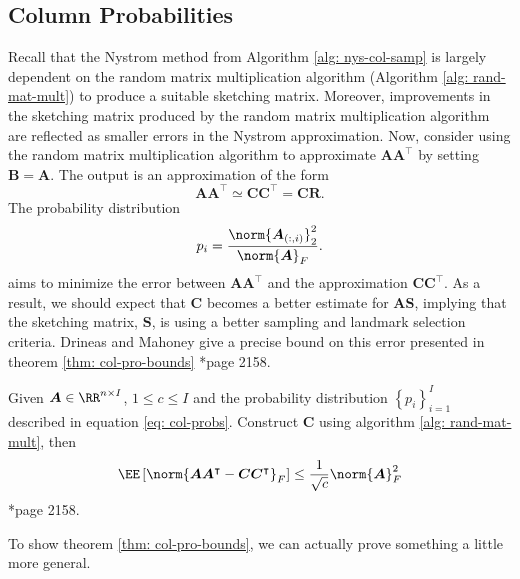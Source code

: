 \subsection{Column Probabilities}\label{Section2.2}

Recall that the Nystrom method from Algorithm \ref{alg: nys-col-samp} is largely dependent on the random matrix multiplication algorithm (Algorithm \ref{alg: rand-mat-mult}) to produce a suitable sketching matrix. Moreover, improvements in the sketching matrix produced by the random matrix multiplication algorithm are reflected as smaller errors in the Nystrom approximation. Now, consider using the random matrix multiplication algorithm to approximate $\bm{A} \bm{A}^{\intercal}$ by setting $\bm{B} = \bm{A}$. The output is an approximation of the form
\begin{equation*}
    \bm{A} \bm{A}^{\intercal} \simeq \bm{C} \bm{C}^{\intercal} = \bm{C} \bm{R}.
\end{equation*}
The probability distribution
\begin{equation*} \label{eq: col-probs}
    p_i = \frac{\norm{\bm{A}_{(:,i)}}_2^2}{\norm{\bm{A}}_F}.
\end{equation*}
aims to minimize the error between $\bm{A} \bm{A}^{\intercal}$ and the approximation $\bm{C} \bm{C}^{\intercal}$. As a result, we should expect that $\bm{C}$ becomes a better estimate for $\bm{A} \bm{S}$, implying that the sketching matrix, $\bm{S}$, is using a better sampling and landmark selection criteria. Drineas and Mahoney give a precise bound on this error presented in theorem \ref{thm: col-pro-bounds} \cite{JMLR:v6:drineas05a}*{page 2158}.

\begin{thm} \label{thm: col-pro-bounds}
    Given $\bm{A} \in \RR^{n \times I}$, $1 \leq c \leq I$ and the probability distribution $\left\{ p_i \right\}_{i=1}^{I}$ described in equation \ref{eq: col-probs}. Construct $\bm{C}$ using algorithm \ref{alg: rand-mat-mult}, then
    \[
        \EE \left[ \norm{\bm{A} \bm{A}^{\intercal} - \bm{C} \bm{C}^{\intercal}}_{F} \right] \leq \frac{1}{\sqrt{c}} \norm{\bm{A}}^2_{F}
    \]
    \cite{JMLR:v6:drineas05a}*{page 2158}.
\end{thm}

To show theorem \ref{thm: col-pro-bounds}, we can actually prove something a little more general.

